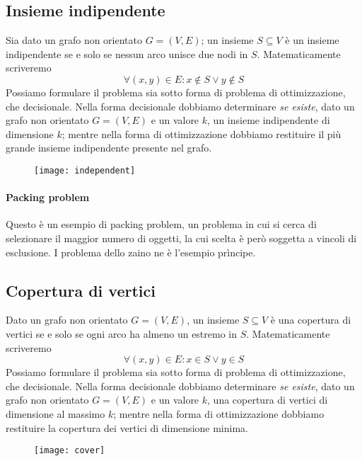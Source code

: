 \vspace{10pt}
\begin{minipage}[c]{.7\textwidth}
\subsection{Insieme indipendente}

Sia dato un grafo non orientato \(G = (V,E)\); un insieme \(S \subseteq V\) è un insieme indipendente se e solo se nessun arco unisce due nodi in \(S\).
Matematicamente scriveremo
\[
    \forall (x,y) \in E : x \not\in S \lor y \not\in S
\]
Possiamo formulare il problema sia sotto forma di problema di ottimizzazione, che decisionale.
Nella forma decisionale dobbiamo determinare \emph{se esiste}, dato un grafo non orientato \(G = (V,E)\) e un valore \(k\), un insieme indipendente di dimensione \(k\); mentre nella forma di ottimizzazione dobbiamo restituire il più grande insieme indipendente presente nel grafo.
\end{minipage}%
\begin{minipage}[c]{.3\textwidth}
\begin{figure}[H]\centering
	\texttt{[image: independent]}
\end{figure}
\end{minipage}

\paragraph{Packing problem}
Questo è un esempio di packing problem, un problema in cui si cerca di selezionare il maggior numero di oggetti, la cui scelta è però soggetta a vincoli di esclusione.
I problema dello zaino ne è l'esempio prìncipe.

\vspace{10pt}
\begin{minipage}[c]{.7\textwidth}
\subsection{Copertura di vertici}

Dato un grafo non orientato \(G = (V,E)\), un insieme \(S \subseteq V\) è una copertura di vertici se e solo se ogni arco ha almeno un estremo in \(S\).
Matematicamente scriveremo
\[
    \forall (x,y) \in E : x \in S \lor y \in S
\]
Possiamo formulare il problema sia sotto forma di problema di ottimizzazione, che decisionale.
Nella forma decisionale dobbiamo determinare \emph{se esiste}, dato un grafo non orientato \(G = (V,E)\) e un valore \(k\), una copertura di vertici di dimensione al massimo \(k\); mentre nella forma di ottimizzazione dobbiamo restituire la copertura dei vertici di dimensione minima.
\end{minipage}%
\begin{minipage}[c]{.3\textwidth}
\begin{figure}[H]\centering
	\texttt{[image: cover]}
\end{figure}
\end{minipage}

